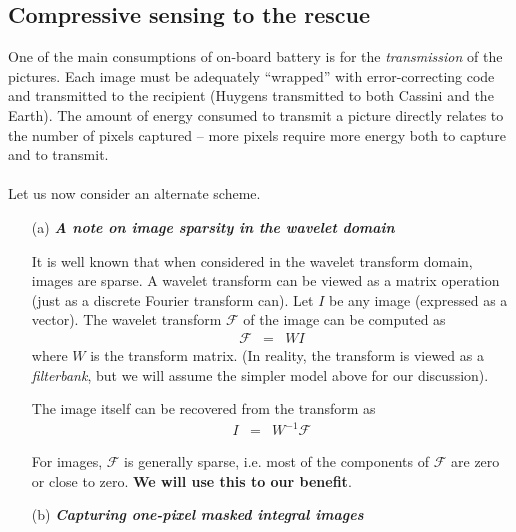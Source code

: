 \subsection*{Compressive sensing to the rescue}
One of the main consumptions of on-board battery is for the \textit{transmission} of the pictures.  Each image must be adequately ``wrapped'' with error-correcting code and transmitted to the recipient (Huygens transmitted to both Cassini and the Earth). The amount of energy consumed to transmit a picture directly relates to the number of pixels captured -- more pixels require more energy both to capture and to transmit.
\\
\\
Let us now consider an alternate scheme.  

\begin{enumerate}
\item[(a)] \textit{\textbf{A note on image sparsity in the wavelet domain}}

It is well known that when considered in the wavelet transform domain, images are sparse. A wavelet transform can be viewed as a matrix operation (just as a discrete Fourier transform can). Let $I$ be any image (expressed as a vector). The wavelet transform $\mathcal{F}$ of the image can be computed as 
\begin{eqnarray}
\mathcal{F} & =& WI
\end{eqnarray}
where $W$ is the transform matrix. (In reality, the transform is viewed as a \textit{filterbank}, but we will assume the simpler model above for our discussion).

The image itself can be recovered from the transform as
\begin{eqnarray}
I & = & W^{-1} \mathcal{F}
\end{eqnarray}

For images, $\mathcal{F}$ is generally sparse, i.e. most of the components of $\mathcal{F}$ are zero or close to zero.\textbf{ We will use this to our benefit}.


\item[(b)] \textit{\textbf{Capturing \textit{one-pixel} masked integral images}}


\end{enumerate}
